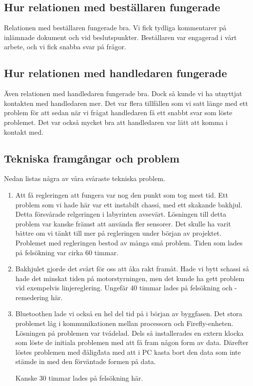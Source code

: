 \documentclass[a4paper,12pt]{article}
\begin{document}
\subsection{Hur relationen med beställaren fungerade}
Relationen med beställaren fungerade bra. Vi fick tydliga kommentarer på inlämnade dokument och vid beslutspunkter. Beställaren var engagerad
i vårt arbete, och vi fick snabba svar på frågor. 

\subsection{Hur relationen med handledaren fungerade}
Även relationen med handledaren fungerade bra. Dock så kunde vi ha utnyttjat kontakten med handledaren mer. Det var flera tillfällen som vi
satt länge med ett problem för att sedan när vi frågat handledaren få ett snabbt svar som löste problemet. Det var också mycket bra att handledaren 
var lätt att komma i kontakt med. 

\subsection{Tekniska framgångar och problem}
Nedan listas några av våra svåraste tekniska problem. 

\begin{enumerate}
\item Att få regleringen att fungera var nog den punkt som tog mest tid. 
Ett problem som vi hade här var ett instabilt chassi, med ett skakande bakhjul. Detta försvårade relgeringen i labyrinten avsevärt. 
Lösningen till detta problem var kanske främst att använda fler sensorer. Det skulle ha varit bättre om vi tänkt till mer på regleringen 
under början av projektet. 
Problemet med regleringen bestod av många små problem. Tiden som lades på felsökning var cirka 60 timmar. 

\item 
Bakhjulet gjorde det svårt för oss att åka rakt framåt. Hade vi bytt schassi så hade det minskat tiden på motorstyrningen, 
men det kunde ha gett problem vid exempelvis linjereglering. 
Ungefär 40 timmar lades på felsökning och -remedering här. 

\item 
Bluetoothen lade vi också en hel del tid på i början av byggfasen. Det stora problemet låg i kommunikationen mellan processorn och Firefly-enheten. 
Lösningen på problemen var tvådelad. Dels så installerades en extern klocka som löste de initiala problemen med att få fram någon 
form av data. Därefter löstes problemen med \"dålig\" data med att i PC kasta bort den data som inte stämde in med den förväntade formen
på data.  

Kanske 30 timmar lades på felsökning här. 
\end{enumerate}
\end{document}
